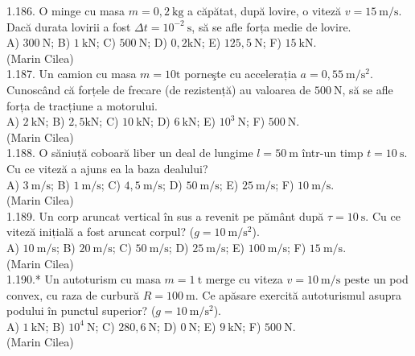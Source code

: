 1.186. O minge cu masa $m=0,2 \mathrm{~kg}$ a căpătat, după lovire, o viteză $v=15 \mathrm{~m} / \mathrm{s}$. Dacă durata lovirii a fost $\Delta t=10^{-2} \mathrm{~s}$, să se afle forța medie de lovire.\\ A) $300 \mathrm{~N}$; B) $1 \mathrm{~kN}$; C) $500 \mathrm{~N}$; D) $0,2 \mathrm{kN}$; E) $125,5 \mathrm{~N}$; F) $15 \mathrm{~kN}$.\\ (Marin Cilea)\\

1.187. Un camion cu masa $m=10 \mathrm{t}$ porneşte cu accelerația $a=0,55 \mathrm{~m} / \mathrm{s}^{2}$. Cunoscând că forțele de frecare (de rezistență) au valoarea de $500 \mathrm{~N}$, să se afle forța de tracțiune a motorului.\\ A) $2 \mathrm{~kN}$; B) $2,5 \mathrm{kN}$; C) $10 \mathrm{~kN}$; D) $6 \mathrm{~kN}$; E) $10^{3} \mathrm{~N}$; F) $500 \mathrm{~N}$.\\ (Marin Cilea)\\

1.188. O săniuță coboară liber un deal de lungime $l=50 \mathrm{~m}$ într-un timp $t=10 \mathrm{~s}$. Cu ce viteză a ajuns ea la baza dealului?\\ A) $3 \mathrm{~m} / \mathrm{s}$; B) $1 \mathrm{~m} / \mathrm{s}$; C) $4,5 \mathrm{~m} / \mathrm{s}$; D) $50 \mathrm{~m} / \mathrm{s}$; E) $25 \mathrm{~m} / \mathrm{s}$; F) $10 \mathrm{~m} / \mathrm{s}$.\\ (Marin Cilea)\\

1.189. Un corp aruncat vertical în sus a revenit pe pământ după $\tau=10 \mathrm{~s}$. Cu ce viteză inițială a fost aruncat corpul? ($g=10 \mathrm{~m} / \mathrm{s}^{2}$).\\ A) $10 \mathrm{~m} / \mathrm{s}$; B) $20 \mathrm{~m} / \mathrm{s}$; C) $50 \mathrm{~m} / \mathrm{s}$; D) $25 \mathrm{~m} / \mathrm{s}$; E) $100 \mathrm{~m} / \mathrm{s}$; F) $15 \mathrm{~m} / \mathrm{s}$.\\ (Marin Cilea)\\

1.190.* Un autoturism cu masa $m=1 \mathrm{~t}$ merge cu viteza $v=10 \mathrm{~m} / \mathrm{s}$ peste un pod convex, cu raza de curbură $R=100 \mathrm{~m}$. Ce apăsare exercită autoturismul asupra podului în punctul superior? ($g=10 \mathrm{~m} / \mathrm{s}^{2}$).\\ A) $1 \mathrm{~kN}$; B) $10^{4} \mathrm{~N}$; C) $280,6 \mathrm{~N}$; D) $0 \mathrm{~N}$; E) $9 \mathrm{~kN}$; F) $500 \mathrm{~N}$.\\ (Marin Cilea)\\


